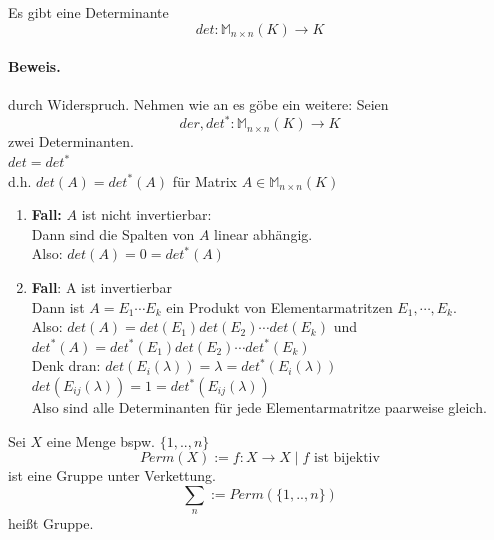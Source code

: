 \documentclass[9pt]{article} %
\begin{document}
\begin{prop}
Es gibt  eine Determinante 
\[det : \mathbb{M}_{n \times n} (K) \rightarrow K\]
\paragraph{Beweis.} durch Widerspruch. Nehmen wie an es göbe ein weitere: 
Seien \[der, det^*: \mathbb{M}_{n \times n} (K) \rightarrow K\] zwei Determinanten. \\
 $det = det^*$ \\
d.h. $det (A) = det^*(A)$ für  Matrix $A \in \mathbb{M}_{n \times n} (K)$
\begin{enumerate}
    \item \textbf{Fall: } $A$ ist nicht invertierbar: \\ Dann sind die Spalten von $A$ linear abhängig. \\
    Also: $det(A) = 0 = det^*(A)$
    \item \textbf{Fall}: A ist invertierbar \\
    Dann ist $A = E_1 \cdots E_k$ ein Produkt von Elementarmatritzen $ E_1, \cdots, E_k$. \\
    Also: $det(A) = det(E_1) det(E_2) \cdots det(E_k)$ und $det^*(A) = det^*(E_1) det(E_2) \cdots det^*(E_k)$  \\
    Denk dran: 
    $det(E_i(\lambda)) = \lambda = det^*(E_i(\lambda))$ \\
    $det(E_{ij}(\lambda)) = 1 = det^*(E_{ij}(\lambda))$ \\
    Also sind alle Determinanten für jede Elementarmatritze paarweise gleich. 
\end{enumerate}
\end{prop}
\begin{er}
Sei $X$ eine Menge bspw. $\{1,..,n\}$
\[Perm(X) := f: X \rightarrow X \mid f\text{ ist bijektiv}\]
ist eine Gruppe unter Verkettung. 
\[\sum_n := Perm(\{1,..,n\})\] heißt  Gruppe.  
\end{er}
\end{document}
